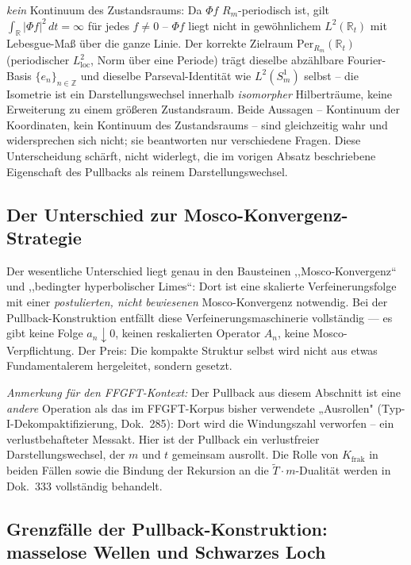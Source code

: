 \begin{kernbox}[title={Präzisierung: zwei verschiedene Bedeutungen von ,,Kontinuum``}]
\emph{kein} Kontinuum des Zustandsraums: Da $\Phi f$ $R_m$-periodisch
ist, gilt $\int_{\mathbb{R}}|\Phi f|^2\,dt=\infty$ für jedes $f\neq0$ --
$\Phi f$ liegt nicht in gewöhnlichem $L^2(\mathbb{R}_t)$ mit Lebesgue-Maß
über die ganze Linie. Der korrekte Zielraum $\mathrm{Per}_{R_m}(\mathbb{R}_t)$
(periodischer $L^2_\mathrm{loc}$, Norm über eine Periode) trägt dieselbe
abzählbare Fourier-Basis $\{e_n\}_{n\in\mathbb{Z}}$ und dieselbe
Parseval-Identität wie $L^2(S^1_m)$ selbst -- die Isometrie ist ein
Darstellungswechsel innerhalb \emph{isomorpher} Hilberträume, keine
Erweiterung zu einem größeren Zustandsraum. Beide Aussagen -- Kontinuum
der Koordinaten, kein Kontinuum
des Zustandsraums -- sind gleichzeitig wahr und widersprechen sich nicht;
sie beantworten nur verschiedene Fragen. Diese Unterscheidung schärft,
nicht widerlegt, die im vorigen Absatz beschriebene Eigenschaft des
Pullbacks als reinem Darstellungswechsel.
\end{kernbox}

\subsection{Der Unterschied zur Mosco-Konvergenz-Strategie}

Der wesentliche Unterschied liegt genau in den Bausteinen ,,Mosco-Kon\-vergenz``
und ,,bedingter hyperbolischer Limes``: Dort ist eine skalierte
Verfeinerungsfolge mit einer \emph{postulierten, nicht bewiesenen}
Mosco-Konvergenz notwendig. Bei der Pullback-Konstruktion entfällt diese
Verfeinerungsmaschinerie vollständig — es gibt keine Folge $a_n\downarrow0$,
keinen reskalierten Operator $A_n$, keine Mosco-Verpflichtung. Der Preis:
Die kompakte Struktur selbst wird nicht aus etwas Fundamentalerem
hergeleitet, sondern gesetzt.

\emph{Anmerkung für den FFGFT-Kontext:} Der Pullback aus diesem
Abschnitt ist eine \emph{andere} Operation als das im FFGFT-Korpus
bisher verwendete „Ausrollen" (Typ-I-Dekompaktifizierung,
Dok.~285): Dort wird die Windungszahl verworfen -- ein
verlustbehafteter Messakt. Hier ist der Pullback ein verlustfreier
Darstellungswechsel, der $m$ und $t$ gemeinsam ausrollt. Die Rolle
von $K_{\text{frak}}$ in beiden Fällen sowie die Bindung der
Rekursion an die $\tilde{T}\cdot m$-Dualität werden in Dok.~333
vollständig behandelt.

\subsection{Grenzfälle der Pullback-Konstruktion: masselose Wellen und Schwarzes Loch}


